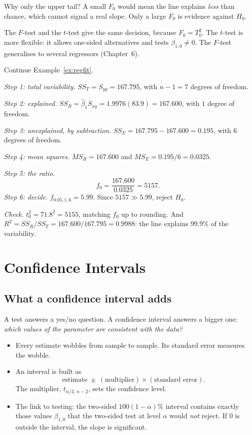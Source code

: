 Why only the upper tail? A small $F_0$ would mean the line explains \emph{less} than chance, which cannot signal a real slope. Only a large $F_0$ is evidence against $H_0$.

The $F$-test and the $t$-test give the same decision, because $F_0=T_0^2$. The $t$-test is more flexible: it allows one-sided alternatives and tests $\beta_{1,0}\ne0$. The $F$-test generalises to several regressors (Chapter~6).

\begin{example}
Continue Example~\ref{ex:regfit}.

\emph{Step 1: total variability.} $SS_T=S_{yy}=167.795$, with $n-1=7$ degrees of freedom.

\emph{Step 2: explained.} $SS_R=\hat\beta_1S_{xy}=1.9976(83.9)=167.600$, with $1$ degree of freedom.

\emph{Step 3: unexplained, by subtraction.} $SS_E=167.795-167.600=0.195$, with $6$ degrees of freedom.

\emph{Step 4: mean squares.} $MS_R=167.600$ and $MS_E=0.195/6=0.0325$.

\emph{Step 5: the ratio.}
\[ f_0=\frac{167.600}{0.0325}=5157. \]
\emph{Step 6: decide.} $f_{0.05,1,6}=5.99$. Since $5157\gg5.99$, reject $H_0$.

\emph{Check.} $t_0^2=71.8^2=5155$, matching $f_0$ up to rounding. And $R^2=SS_R/SS_T=167.600/167.795=0.9988$: the line explains $99.9\%$ of the variability.
\end{example}

\section{Confidence Intervals}

\subsection{What a confidence interval adds}

A test answers a yes/no question. A confidence interval answers a bigger one: \emph{which values of the parameter are consistent with the data?}

\begin{itemize}
  \item Every estimate wobbles from sample to sample. Its standard error measures the wobble.
  \item An interval is built as
  \[ \text{estimate}\ \pm\ (\text{multiplier})\times(\text{standard error}). \]
  The multiplier, $t_{\alpha/2,\,n-2}$, sets the confidence level.
  \item The link to testing: the two-sided $100(1-\alpha)\%$ interval contains exactly those values $\beta_{1,0}$ that the two-sided test at level $\alpha$ would \emph{not} reject. If $0$ is outside the interval, the slope is significant.
\end{itemize}

